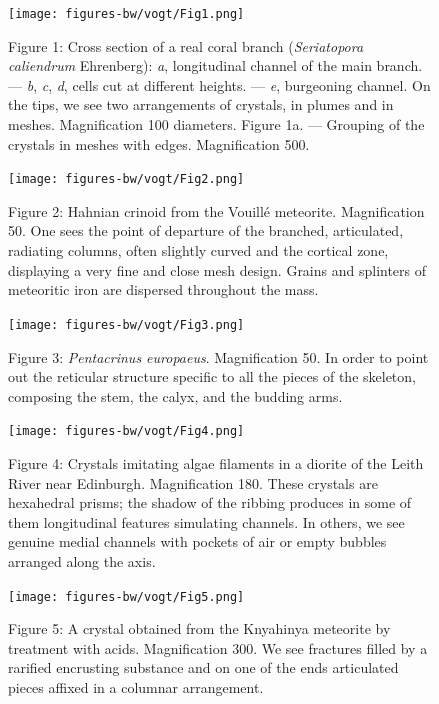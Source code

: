 \documentclass[a4paper, 12pt, oneside]{article}
\begin{document}
\clearpage
\pagestyle{fancy}
\fancyhf{}
\cfoot{\thepage}
\begin{figure}[b]
\texttt{[image: figures-bw/vogt/Fig1.png]}
\caption{Figure 1: Cross section of a real coral branch (\emph{Seriatopora caliendrum} Ehrenberg): \emph{a}, longitudinal channel of the main branch. --- \emph{b}, \emph{c}, \emph{d}, cells cut at different heights. --- \emph{e}, burgeoning channel. On the tips, we see two arrangements of crystals, in plumes and in meshes. Magnification 100 diameters. Figure 1a. --- Grouping of the crystals in meshes with edges. Magnification 500.}
\centering
\end{figure}
\clearpage
\begin{figure}[b]
\texttt{[image: figures-bw/vogt/Fig2.png]}
\caption{Figure 2: Hahnian crinoid from the Vouillé meteorite. Magnification 50. One sees the point of departure of the branched, articulated, radiating columns, often slightly curved and the cortical zone, displaying a very fine and close mesh design. Grains and splinters of meteoritic iron are dispersed throughout the mass.}
\centering
\end{figure}
\clearpage
\begin{figure}[b]
\texttt{[image: figures-bw/vogt/Fig3.png]}
\caption{Figure 3: \emph{Pentacrinus europaeus}. Magnification 50. In order to point out the reticular structure specific to all the pieces of the skeleton, composing the stem, the calyx, and the budding arms.}
\centering
\end{figure}
\clearpage
\begin{figure}[b]
\texttt{[image: figures-bw/vogt/Fig4.png]}
\caption{Figure 4: Crystals imitating algae filaments in a diorite of the Leith River near Edinburgh. Magnification 180. These crystals are hexahedral prisms; the shadow of the ribbing produces in some of them longitudinal features simulating channels. In others, we see genuine medial channels with pockets of air or empty bubbles arranged along the axis.}
\centering
\end{figure}
\clearpage
\begin{figure}[b]
\centering
\texttt{[image: figures-bw/vogt/Fig5.png]}
\caption{Figure 5: A crystal obtained from the Knyahinya meteorite by treatment with acids. Magnification 300. We see fractures filled by a rarified encrusting substance and on one of the ends articulated pieces affixed in a columnar arrangement.}
\end{figure}
\end{document}
